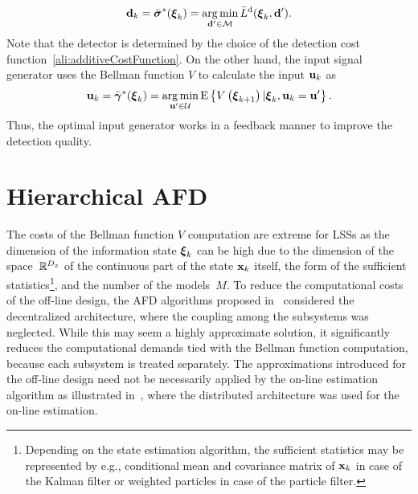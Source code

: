 \documentclass[conference,letterpaper]{IEEEtran}
\def\nth{\prescript{n\!}{}}
\begin{document}
\begin{align}\label{ali:optimalDecision}
	\mathbf{d}_{k} = \bar{\boldsymbol{\sigma}}^{*}(\boldsymbol{\xi}_{k}) = \operatorname*{arg\,min}_{\mathbf{d}'\in\mathcal{M}} \bar{L}^{\mathrm{d}}(\boldsymbol{\xi}_{k},\mathbf{d}').
\end{align}
Note that the detector is determined by the choice of the detection cost function~\eqref{ali:additiveCostFunction}. 
On the other hand, the input signal generator uses the Bellman function $V$ to calculate the input $\mathbf{u}_k$ as
\begin{align}\label{ali:optimalInput}
	\mathbf{u}_{k} = \bar{\boldsymbol{\gamma}}^{*}(\boldsymbol{\xi}_{k}) = 	\operatorname*{arg\,min}_{\mathbf{u}'\in\mathcal{U}} \operatorname*{E} \left\{ V \left( \boldsymbol{\xi}_{k+1}\right) \vert \boldsymbol{\xi}_{k},\mathbf{u}_k=\mathbf{u}' \right\}.
\end{align}
Thus, the optimal input generator works in a feedback manner to improve the detection quality.  
\section{Hierarchical AFD}\label{sec:hierarchical_afd}
The costs of the Bellman function $V$  computation are extreme for LSSs as the dimension of the information state $\boldsymbol{\xi}_{k}$ can be high due to the dimension of the space~$\mathbb{R}^{D_x}$  of the continuous part of the state $\mathbf{x}_k$ itself, the form of the sufficient statistics\footnote{Depending on the state estimation algorithm, the sufficient statistics may be represented by e.g., conditional mean and covariance matrix of $\mathbf{x}_k$ in case of the Kalman filter  or weighted particles in case of the particle filter.}, and the number of the models~$M$. 
To reduce the computational costs of the off-line design, the AFD algorithms proposed in~\cite{Puncochar2019:cp:ACC,Straka2019:cp:FUSION} considered the decentralized architecture, where the coupling among the subsystems was neglected.
While this may seem a highly approximate solution, it significantly reduces the computational demands tied with the Bellman function computation, because each subsystem is treated separately.
The approximations introduced for the off-line design need not be necessarily applied by the on-line estimation algorithm as illustrated in~\cite{Straka2019:cp:FUSION}, where the distributed architecture was used for the on-line estimation.
\end{document}
